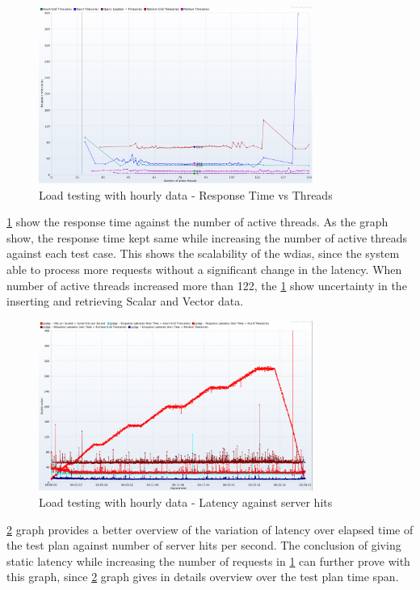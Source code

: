 \begin{figure}[htp]
    \centering
    \includegraphics[width=0.8\textwidth]{results/obs/all/obs_all_60m_response_times_vs_threads.png}
    \caption{Load testing with hourly data - Response Time vs Threads}
    \label{fi:test_obs_all_60m_response_vs_threads}
\end{figure}
\ref{fi:test_obs_all_60m_response_vs_threads} show the response time against the number of active threads. As the graph show, the response time kept same while increasing the number of active threads against each test case. This shows the scalability of the \acrshort{wdias}, since the system able to process more requests without a significant change in the latency.
When number of active threads increased more than 122, the \ref{fi:test_obs_all_60m_response_vs_threads} show uncertainty in the inserting and retrieving Scalar and Vector data.

\begin{figure}[htp]
    \centering
    \includegraphics[width=0.8\textwidth]{results/obs/all/obs_all_60m_res_latencies_against_hits.png}
    \caption{Load testing with hourly data - Latency against server hits}
    \label{fi:test_obs_all_60m_latency}
\end{figure}
\ref{fi:test_obs_all_60m_latency} graph provides a better overview of the variation of latency over elapsed time of the test plan against number of server hits per second.
The conclusion of giving static latency while increasing the number of requests in \ref{fi:test_obs_all_60m_response_vs_threads} can further prove with this graph, since \ref{fi:test_obs_all_60m_latency} graph gives in details overview over the test plan time span.


